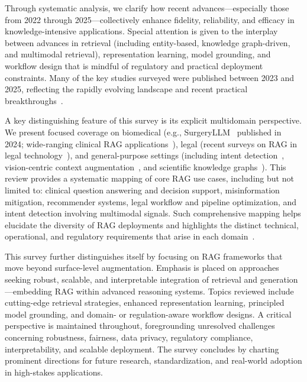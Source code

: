 \documentclass[sigconf]{acmart}
\begin{document}
Through systematic analysis, we clarify how recent advances—especially those from 2022 through 2025—collectively enhance fidelity, reliability, and efficacy in knowledge-intensive applications. Special attention is given to the interplay between advances in retrieval (including entity-based, knowledge graph-driven, and multimodal retrieval), representation learning, model grounding, and workflow design that is mindful of regulatory and practical deployment constraints. Many of the key studies surveyed were published between 2023 and 2025, reflecting the rapidly evolving landscape and recent practical breakthroughs~\cite{ref1, ref2, ref3, ref4, ref5, ref6, ref7, ref8, ref29, ref30, ref31, ref42, ref48, ref51, ref52, ref53, ref54, ref55, ref61, ref62, ref63, ref64}.

A key distinguishing feature of this survey is its explicit multidomain perspective. We present focused coverage on biomedical (e.g., SurgeryLLM~\cite{ref1} published in 2024; wide-ranging clinical RAG applications~\cite{ref2,ref5,ref6,ref7,ref48,ref52,ref53,ref54,ref55}), legal (recent surveys on RAG in legal technology~\cite{ref63}), and general-purpose settings (including intent detection~\cite{ref61}, vision-centric context augmentation~\cite{ref62}, and scientific knowledge graphs~\cite{ref29,ref30,ref31}). This review provides a systematic mapping of core RAG use cases, including but not limited to: clinical question answering and decision support, misinformation mitigation, recommender systems, legal workflow and pipeline optimization, and intent detection involving multimodal signals. Such comprehensive mapping helps elucidate the diversity of RAG deployments and highlights the distinct technical, operational, and regulatory requirements that arise in each domain~\cite{ref1, ref2, ref3, ref5, ref6, ref7, ref8, ref29, ref30, ref31, ref42, ref48, ref51, ref52, ref53, ref54, ref55, ref63}.

This survey further distinguishes itself by focusing on RAG frameworks that move beyond surface-level augmentation. Emphasis is placed on approaches seeking robust, scalable, and interpretable integration of retrieval and generation---embedding RAG within advanced reasoning systems. Topics reviewed include cutting-edge retrieval strategies, enhanced representation learning, principled model grounding, and domain- or regulation-aware workflow designs. A critical perspective is maintained throughout, foregrounding unresolved challenges concerning robustness, fairness, data privacy, regulatory compliance, interpretability, and scalable deployment. The survey concludes by charting prominent directions for future research, standardization, and real-world adoption in high-stakes applications.
\end{document}
